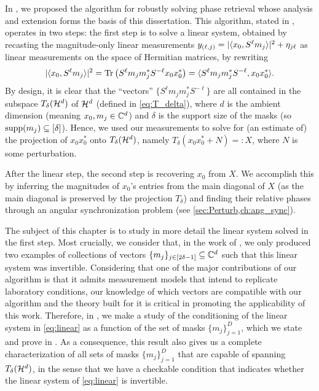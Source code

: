 In , we proposed the algorithm for robustly solving phase retrieval whose analysis and extension forms the basis of this dissertation.  This algorithm, stated in , operates in two steps: the first step is to solve a linear system, obtained by recasting the magnitude-only linear measurements $y_{(\ell, j)} = \lvert\langle x_0, S^{\ell} m_j\rangle\rvert^2 + \eta_{j \ell}$ as linear measurements on the space of Hermitian matrices, by rewriting \[\lvert\langle x_0, S^{\ell} m_j\rangle\rvert^2 = \operatorname{Tr}\left(S^{\ell} m_j m_j^* S^{- \ell} x_0 x_0^*\right) = \langle S^{\ell} m_j m_j^* S^{- \ell}, x_0 x_0^*\rangle.\]  By design, it is clear that the ``vectors'' $\{S^{\ell} m_j m_j^* S^{- \ell}\}$ are all contained in the subspace $T_\delta(\mathcal{H}^d)$ of $\mathcal{H}^d$ (defined in \eqref{eq:T_delta}), where $d$ is the ambient dimension (meaning $x_0, m_j \in \mathbb{C}^d$) and $\delta$ is the support size of the masks (so $\operatorname{supp}(m_j) \subseteq [\delta]$).  Hence, we used our measurements to solve for (an estimate of) the projection of $x_0 x_0^*$ onto $T_\delta(\mathcal{H}^d)$, namely $T_\delta(x_0 x_0^* + N) =: X$, where $N$ is some perturbation.

After the linear step, the second step is recovering $x_0$ from $X$.  We accomplish this by inferring the magnitudes of $x_0$'s entries from the main diagonal of $X$ (as the main diagonal is preserved by the projection $T_\delta$) and finding their relative phases through an angular synchronization problem (see \cref{sec:Perturb,ch:ang_sync}).

The subject of this chapter is to study in more detail the linear system solved in the first step.  Most crucially, we consider that, in the work of , we only produced two examples of collections of vectors $\{m_j\}_{j \in [2 \delta - 1]} \subseteq \mathbb{C}^d$ such that this linear system was invertible.  Considering that one of the major contributions of our algorithm is that it admits measurement models that intend to replicate laboratory conditions, our knowledge of which vectors are compatible with our algorithm and the theory built for it is critical in promoting the applicability of this work.  Therefore, in , we make a study of the conditioning of the linear system in \eqref{eq:linear} as a function of the set of masks $\{m_j\}_{j = 1}^D$, which we state and prove in .  As a consequence, this result also gives us a complete characterization of all sets of masks $\{m_j\}_{j = 1}^D$ that are capable of spanning $T_\delta(\mathcal{H}^d)$, in the sense that we have a checkable condition that indicates whether the linear system of \eqref{eq:linear} is invertible.  %


